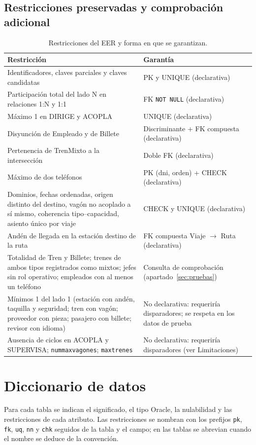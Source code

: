 \documentclass[11pt,a4paper]{article}
\DeclareRobustCommand{\_}{\textunderscore\allowbreak}
\newcommand{\tb}[1]{\texttt{#1}}
\begin{document}
\subsection{Restricciones preservadas y comprobación adicional}
\begin{table}[!htbp]
\centering\small
\caption{Restricciones del EER y forma en que se garantizan.}
\begin{tabularx}{\linewidth}{>{\raggedright\arraybackslash}X >{\raggedright\arraybackslash}p{6.4cm}}
\toprule
\textbf{Restricción} & \textbf{Garantía} \\
\midrule
Identificadores, claves parciales y claves candidatas & PK y UNIQUE (declarativa) \\
Participación total del lado N en relaciones 1:N y 1:1 & FK \tb{NOT NULL} (declarativa) \\
Máximo 1 en DIRIGE y ACOPLA & UNIQUE (declarativa) \\
Disyunción de Empleado y de Billete & Discriminante + FK compuesta (declarativa) \\
Pertenencia de Tren\_Mixto a la intersección & Doble FK (declarativa) \\
Máximo de dos teléfonos & PK (dni, orden) + CHECK (declarativa) \\
Dominios, fechas ordenadas, origen distinto del destino, vagón no acoplado a sí mismo, coherencia tipo–capacidad, asiento único por viaje & CHECK y UNIQUE (declarativa) \\
Andén de llegada en la estación destino de la ruta & FK compuesta Viaje $\rightarrow$ Ruta (declarativa) \\
\midrule
Totalidad de Tren y Billete; trenes de ambos tipos registrados como mixtos; jefes sin rol operativo; empleados con al menos un teléfono & Consulta de comprobación (apartado~\ref{sec:pruebas}) \\
Mínimos 1 del lado 1 (estación con andén, taquilla y seguridad; tren con vagón; proveedor con pieza; pasajero con billete; revisor con idioma) & No declarativa: requeriría disparadores; se respeta en los datos de prueba \\
Ausencia de ciclos en ACOPLA y SUPERVISA; \tb{num\_max\_vagones}; \tb{max\_trenes} & No declarativa: requeriría disparadores (ver Limitaciones) \\
\bottomrule
\end{tabularx}
\end{table}

\section{Diccionario de datos}
Para cada tabla se indican el significado, el tipo Oracle, la nulabilidad y las restricciones de cada atributo. Las restricciones se nombran con los prefijos \tb{pk\_}, \tb{fk\_}, \tb{uq\_}, \tb{nn\_} y \tb{chk\_} seguidos de la tabla y el campo; en las tablas se abrevian cuando el nombre se deduce de la convención.
\end{document}
